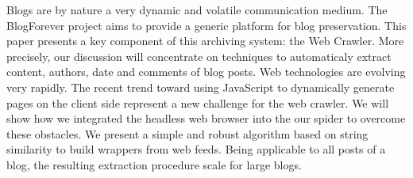 Blogs are by nature a very dynamic and volatile communication medium. The BlogForever project aims to provide a generic platform for blog preservation. This paper presents a key component of this archiving system: the Web Crawler. More precisely, our discussion will concentrate on techniques to automaticaly extract content, authors, date and comments of blog posts. Web technologies are evolving very rapidly. The recent trend toward using JavaScript to dynamically generate pages on the client side represent a new challenge for the web crawler. We will show how we integrated the headless web browser into the our spider to overcome these obstacles. We present a simple and robust algorithm based on string similarity to build wrappers from web feeds. Being applicable to all posts of a blog, the resulting extraction procedure scale for large blogs.
